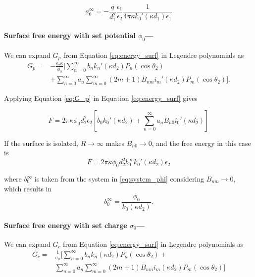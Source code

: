 \begin{equation} \label{eq:a0_inf}
a_0^{\infty} = -\frac{q}{d_1^2}\frac{\epsilon_1}{\epsilon_2} \frac{1}{4\pi\kappa k_0'(\kappa d_1) \epsilon_1}
\end{equation}


\medskip
\paragraph*{Surface  free energy with set potential $\phi_0$---}
We can expand $G_p$ from Equation \eqref{eq:energy_surf} in Legendre polynomials as
%
\begin{align} \label{eq:G_p}
G_p = &-\frac{\epsilon_2 \kappa}{\phi_0}  \Bigg[ \sum_{n=0}^{\infty} b_n k_n'(\kappa d_2) P_n(\cos \theta_2) \nonumber \\ 
& + \sum_{n=0}^{\infty} a_n \sum_{m=0}^{\infty} (2m+1) B_{nm} i_m'(\kappa d_2) P_m(\cos \theta_2) \Bigg].
\end{align}

 \noindent Applying Equation \eqref{eq:G_p} in Equation \eqref{eq:energy_surf} gives

\begin{equation} \label{G_p_int}
F = 2\pi \kappa \phi_0 d_2^2 \epsilon_2 \left[ b_0 k_0'(\kappa d_2) + \sum_{n=0}^{\infty} a_n B_{n0} i_0'(\kappa d_2) \right]
\end{equation}

 \noindent If the surface is isolated, $R \to \infty$ makes $B_{n0} \to 0$, and the free energy in this case is 
%
\begin{equation} \label{energy_isolated_phi}
F = 2\pi \kappa \phi_0 d_2^2 b_0^{\infty} k_0'(\kappa d_2) \epsilon_2
\end{equation}
 
 \noindent where $b_0^{\infty}$ is taken from the system in  \eqref{eq:system_phi} considering $B_{nm} \to 0$, which results in
 \begin{equation} \label{b_inf_phi}
 b_0^{\infty} = \frac{\phi_0}{k_0(\kappa d_2)}.
 \end{equation}
 
 \medskip
 \paragraph*{Surface  free energy with set charge $\sigma_0$---}
We can expand $G_c$ from Equation \eqref{eq:energy_surf} in Legendre polynomials as
%
\begin{align} \label{eq:G_c}
G_c = & \frac{1}{\sigma_0} \Bigg[ \sum_{n=0}^{\infty} b_n k_n(\kappa d_2) P_n(\cos \theta_2) + \nonumber \\ 
&\sum_{n=0}^{\infty} a_n \sum_{m=0}^{\infty} (2m+1) B_{nm} i_m(\kappa d_2) P_m(\cos \theta_2) \Bigg]
\end{align}

